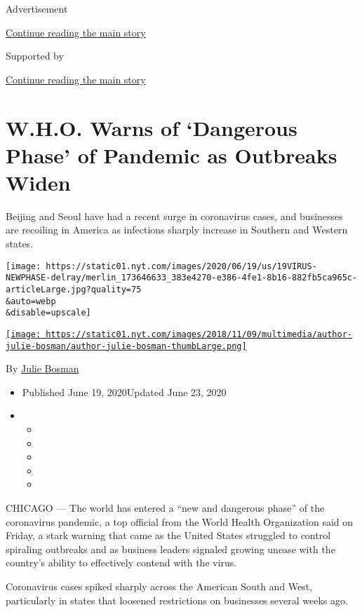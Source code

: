Advertisement

\protect\hyperlink{after-top}{Continue reading the main story}

Supported by

\protect\hyperlink{after-sponsor}{Continue reading the main story}

\hypertarget{who-warns-of-dangerous-phase-of-pandemic-as-outbreaks-widen-}{%
\section{W.H.O. Warns of `Dangerous Phase' of Pandemic as Outbreaks
Widen
}\label{who-warns-of-dangerous-phase-of-pandemic-as-outbreaks-widen-}}

Beijing and Seoul have had a recent surge in coronavirus cases, and
businesses are recoiling in America as infections sharply increase in
Southern and Western states.

\texttt{[image: https://static01.nyt.com/images/2020/06/19/us/19VIRUS-NEWPHASE-delray/merlin\_173646633\_383e4270-e386-4fe1-8b16-882fb5ca965c-articleLarge.jpg?quality=75\\\&auto=webp\\\&disable=upscale]}

\href{https://www.nytimes.com/by/julie-bosman}{\texttt{[image: https://static01.nyt.com/images/2018/11/09/multimedia/author-julie-bosman/author-julie-bosman-thumbLarge.png]}}

By \href{https://www.nytimes.com/by/julie-bosman}{Julie Bosman}

\begin{itemize}
\item
  Published June 19, 2020Updated June 23, 2020
\item
  \begin{itemize}
  \item
  \item
  \item
  \item
  \item
  \end{itemize}
\end{itemize}

CHICAGO --- The world has entered a ``new and dangerous phase'' of the
coronavirus pandemic, a top official from the World Health Organization
said on Friday, a stark warning that came as the United States struggled
to control spiraling outbreaks and as business leaders signaled growing
unease with the country's ability to effectively contend with the virus.

Coronavirus cases spiked sharply across the American South and West,
particularly in states that loosened restrictions on businesses several
weeks ago.

